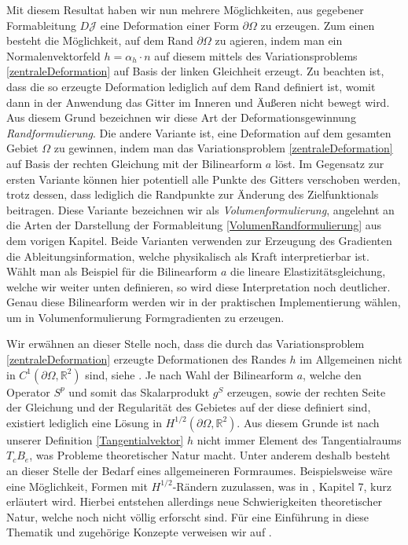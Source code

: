 Mit diesem Resultat haben wir nun mehrere Möglichkeiten, aus gegebener Formableitung $D\mathcal{J}$ eine Deformation einer Form $\partial\Omega$ zu erzeugen. Zum einen besteht die Möglichkeit, auf dem Rand $\partial\Omega$ zu agieren, indem man ein Normalenvektorfeld $h = \alpha_h \cdot n$ auf diesem mittels des Variationsproblems \ref{zentraleDeformation} auf Basis der linken Gleichheit erzeugt. Zu beachten ist, dass die so erzeugte Deformation lediglich auf dem Rand definiert ist, womit dann in der Anwendung das Gitter im Inneren und Äußeren nicht bewegt wird. Aus diesem Grund bezeichnen wir diese Art der Deformationsgewinnung \textit{Randformulierung}. Die andere Variante ist, eine Deformation auf dem gesamten Gebiet $\Omega$ zu gewinnen, indem man das Variationsproblem \ref{zentraleDeformation} auf Basis der rechten Gleichung mit der Bilinearform 
$a$ löst. Im Gegensatz zur ersten Variante können hier potentiell alle Punkte des Gitters verschoben werden, trotz dessen, dass lediglich die Randpunkte zur Änderung des Zielfunktionals beitragen. Diese Variante bezeichnen wir als \textit{Volumenformulierung}, angelehnt an die Arten der Darstellung der Formableitung \ref{VolumenRandformulierung} aus dem vorigen Kapitel. Beide Varianten verwenden zur Erzeugung des Gradienten die Ableitungsinformation, welche physikalisch als Kraft interpretierbar ist. Wählt man als Beispiel für die Bilinearform $a$ die lineare Elastizitätsgleichung, welche wir weiter unten definieren, so wird diese Interpretation noch deutlicher. Genau diese Bilinearform werden wir in der praktischen Implementierung wählen, um in Volumenformulierung Formgradienten zu erzeugen.

Wir erwähnen an dieser Stelle noch, dass die durch das Variationsproblem \ref{zentraleDeformation} erzeugte Deformationen des Randes $h$ im Allgemeinen nicht in $C^1(\partial\Omega,\mathbb{R}^2)$ sind, siehe \cite{bfgs2}. Je nach Wahl der Bilinearform $a$, welche den Operator $S^p$ und somit das Skalarprodukt $g^S$ erzeugen, sowie der rechten Seite der Gleichung und der Regularität des Gebietes auf der diese definiert sind, existiert lediglich eine Lösung in $H^{1/2}(\partial\Omega,\mathbb{R}^2)$. Aus diesem Grunde ist nach unserer Definition \ref{Tangentialvektor} $h$ nicht immer Element des Tangentialraums $T_cB_e$, was Probleme theoretischer Natur macht. Unter anderem deshalb besteht an dieser Stelle der Bedarf eines allgemeineren Formraumes. Beispielsweise wäre eine Möglichkeit, Formen mit $H^{1/2}$-Rändern zuzulassen, was in \cite{shape_space}, Kapitel 7, kurz erläutert wird. Hierbei entstehen allerdings neue Schwierigkeiten theoretischer Natur, welche noch nicht völlig erforscht sind. Für eine Einführung in diese Thematik und zugehörige Konzepte verweisen wir auf \cite{diffeology}.


